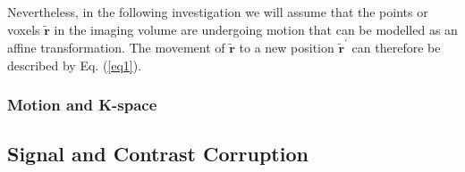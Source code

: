 \documentclass[class=article, crop=false]{standalone}
\begin{document}
\par
Nevertheless, in the following investigation we will assume that the points or voxels $\tilde{\textbf{r}}$ in the imaging volume are undergoing motion that can be modelled as an affine transformation. The movement of $\tilde{\textbf{r}}$ to a new position $\tilde{\textbf{r}}^{'}$ can therefore be described by Eq. (\ref{eq1}).

\subsubsection*{Motion and K-space}

\subsection{Signal and Contrast Corruption}
\end{document}
